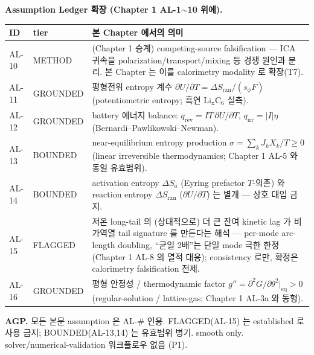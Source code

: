 \documentclass[11pt,a4paper]{article}
\newcommand{\eq}{\mathrm{eq}}
\newcommand{\rxn}{\mathrm{rxn}}
\newcommand{\rev}{\mathrm{rev}}
\newcommand{\irr}{\mathrm{irr}}
\begin{document}
\textbf{Assumption Ledger 확장 (Chapter 1 AL-1$\sim$10 위에).}
\begin{longtable}{p{} p{} p{}}
\toprule ID & tier & 본 Chapter 에서의 의미 \\ \midrule \endhead
AL-10 & METHOD & (Chapter 1 승계) competing-source falsification — ICA 귀속을 polarization/transport/mixing 등 경쟁 원인과 분리. 본 Chapter 는 이를 calorimetry modality 로 확장(T7). \\
AL-11 & GROUNDED & 평형전위 entropy 계수 $\partial U/\partial T=\Delta S_\rxn/(s_\phi F)$ (potentiometric entropy; 흑연 $\mathrm{Li_xC_6}$ 실측). \\
AL-12 & GROUNDED & battery 에너지 balance: $q_\rev=IT\,\partial U/\partial T$, $q_\irr=|I|\eta$ (Bernardi--Pawlikowski--Newman). \\
AL-13 & BOUNDED & near-equilibrium entropy production $\sigma=\sum_k J_kX_k/T\ge0$ (linear irreversible thermodynamics; Chapter 1 AL-5 와 동일 유효범위). \\
AL-14 & BOUNDED & activation entropy $\Delta S_a$ (Eyring prefactor $T$-의존) 와 reaction entropy $\Delta S_\rxn$ ($\partial U/\partial T$) 는 별개 — 상호 대입 금지. \\
AL-15 & FLAGGED & 저온 long-tail 의 (상대적으로) 더 큰 잔여 kinetic lag 가 비가역열 tail signature 를 만든다는 해석 — per-mode arc-length doubling, ``균일 2배''는 단일 mode 극한 한정 (Chapter 1 AL-8 의 열적 대응); consistency 로만, 확정은 calorimetry falsification 전제. \\
AL-16 & GROUNDED & 평형 안정성 / thermodynamic factor $g''=\partial^2 G/\partial\theta^2|_\eq>0$ (regular-solution / lattice-gas; Chapter 1 AL-3a 와 동형). \\
\bottomrule
\end{longtable}
\textbf{AGP.} 모든 본문 assumption 은 AL-\# 인용. FLAGGED(AL-15) 는 established 로 사용 금지;
BOUNDED(AL-13,14) 는 유효범위 병기. smooth only. solver/numerical-validation 워크플로우 없음 (P1).

\end{document}

